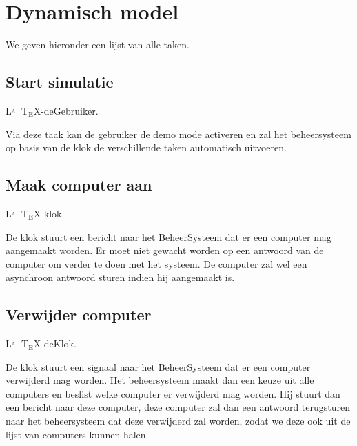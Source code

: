 \documentclass[a4paper,oneside]{report}
\def\latex{$\mathrm{L\!\!^{{}_{\scriptstyle A}} \!\!\!\!\!\;\; T\!_{\displaystyle E} \!
X}$}
\begin{document}
\eindlemma
{}
\newpage
{}
\newpage
\section{Dynamisch model}
We geven hieronder een lijst van alle taken.
%
%

\newpage
\subsection{Start simulatie}
\latex-deGebruiker.

Via deze taak kan de gebruiker de demo mode activeren en zal het beheersysteem op basis van de klok de verschillende taken automatisch uitvoeren.


\newpage
\subsection{Maak computer aan}
\latex-klok.

De klok stuurt een bericht naar het BeheerSysteem dat er een computer mag aangemaakt worden. Er moet niet gewacht worden op een antwoord van de computer om verder te doen met het systeem. De computer zal wel een asynchroon antwoord sturen indien hij aangemaakt is.


\newpage
\subsection{Verwijder computer}
\latex-deKlok.

De klok stuurt een signaal naar het BeheerSysteem dat er een computer verwijderd mag worden. Het beheersysteem maakt dan een keuze uit alle computers en beslist welke computer er verwijderd mag worden. Hij stuurt dan een bericht naar deze computer, deze computer zal dan een antwoord terugsturen naar het beheersysteem dat deze verwijderd zal worden, zodat we deze ook uit de lijst van computers kunnen halen.


\newpage
\end{document}
